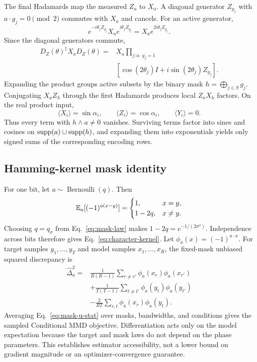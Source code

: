 The final Hadamards map the measured $Z_a$ to $X_a$.  A diagonal generator
$Z_{g_j}$ with $a\cdot g_j=0\pmod2$ commutes with $X_a$ and cancels.  For an
active generator,
\begin{equation}
 e^{-i\theta_jZ_{g_j}}X_ae^{i\theta_jZ_{g_j}}
 =X_ae^{2i\theta_jZ_{g_j}}.
\end{equation}
Since the diagonal generators commute,
\begin{equation}
 \begin{split}
 D_Z(\theta)^\dagger X_aD_Z(\theta)={}&X_a
 \prod_{j:a\cdot g_j=1}\\
 &\left[\cos(2\theta_j)I+i\sin(2\theta_j)Z_{g_j}\right].
 \end{split}
 \label{eq:active-product-foundations}
\end{equation}
Expanding the product groups active subsets by the binary mask
$h=\bigoplus_{j\in S}g_j$.  Conjugating $X_aZ_h$ through the first Hadamards
produces local $Z_aX_h$ factors.  On the real product input,
\begin{equation}
 \langle X_i\rangle=\sin\alpha_i,\qquad
 \langle Z_i\rangle=\cos\alpha_i,\qquad
 \langle Y_i\rangle=0.
\end{equation}
Thus every term with $h\wedge a\ne0$ vanishes.  Surviving terms factor into
sines and cosines on $\operatorname{supp}(a)\cup\operatorname{supp}(h)$, and expanding them into
exponentials yields only signed sums of the corresponding encoding rows.

\subsection{Hamming-kernel mask identity}

For one bit, let $a\sim\operatorname{Bernoulli}(q)$.  Then
\begin{equation}
 \mathbb{E}_a[(-1)^{a(x-y)}]=
 \begin{cases}
 1,&x=y,\\
 1-2q,&x\ne y.
 \end{cases}
\end{equation}
Choosing $q=q_\sigma$ from Eq.~\eqref{eq:mask-law} makes
$1-2q=e^{-1/(2\sigma^2)}$.  Independence across bits therefore gives
Eq.~\eqref{eq:character-kernel}.  Let
$\phi_a(x)=(-1)^{a\cdot x}$.  For target samples $y_1,\ldots,y_T$ and model
samples $x_1,\ldots,x_R$, the fixed-mask unbiased squared discrepancy is
\begin{align}
 \widehat\Delta_a^2={}&
 \frac{1}{R(R-1)}\sum_{r\ne r'}\phi_a(x_r)\phi_a(x_{r'})
 \nonumber\\
 &+\frac{1}{T(T-1)}\sum_{t\ne t'}\phi_a(y_t)\phi_a(y_{t'})
 \nonumber\\
 &-\frac{2}{RT}\sum_{r,t}\phi_a(x_r)\phi_a(y_t).
 \label{eq:mask-u-stat}
\end{align}
Averaging Eq.~\eqref{eq:mask-u-stat} over masks, bandwidths, and conditions
gives the sampled Conditional MMD objective.  Differentiation acts only on the
model expectation because the target and mask laws do not depend on the phase
parameters.  This establishes estimator accessibility, not a lower bound on
gradient magnitude or an optimizer-convergence guarantee.


